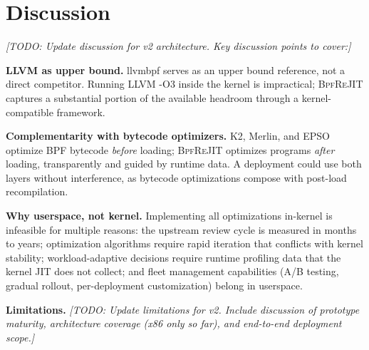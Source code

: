 


\section{Discussion}
\label{sec:discussion}

\textit{[TODO: Update discussion for v2 architecture. Key discussion
points to cover:]}

\textbf{LLVM as upper bound.} llvmbpf serves as an upper bound
reference, not a direct competitor. Running LLVM -O3 inside the kernel
is impractical; \textsc{BpfReJIT} captures a substantial portion of the
available headroom through a kernel-compatible framework.

\textbf{Complementarity with bytecode optimizers.} K2, Merlin, and
EPSO optimize BPF bytecode \emph{before} loading; \textsc{BpfReJIT}
optimizes programs \emph{after} loading, transparently and guided by
runtime data. A deployment could use both layers without interference,
as bytecode optimizations compose with post-load recompilation.

\textbf{Why userspace, not kernel.} Implementing all optimizations
in-kernel is infeasible for multiple reasons: the upstream review cycle
is measured in months to years; optimization algorithms require rapid
iteration that conflicts with kernel stability; workload-adaptive
decisions require runtime profiling data that the kernel JIT does not
collect; and fleet management capabilities (A/B testing, gradual
rollout, per-deployment customization) belong in userspace.

\textbf{Limitations.}
\textit{[TODO: Update limitations for v2. Include discussion of
prototype maturity, architecture coverage (x86 only so far), and
end-to-end deployment scope.]}